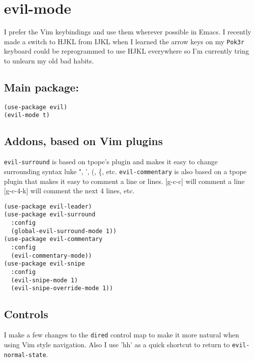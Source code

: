 \documentclass{article}
\begin{document}
\section{evil-mode}
\label{sec-7}

I prefer the Vim keybindings and use them wherever possible in Emacs. I recently made a switch to HJKL from IJKL when I learned the arrow keys on my \texttt{Pok3r} keyboard could be reprogrammed to use HJKL everywhere so I'm currently tring to unlearn my old bad habits.

\subsection{Main package:}
\label{sec-7-1}

\begin{verbatim}
(use-package evil)
(evil-mode t)
\end{verbatim}

\subsection{Addons, based on Vim plugins}
\label{sec-7-2}

\texttt{evil-surround} is based on tpope's plugin and makes it easy to change surrounding syntax luke ", ', (, \{, etc. \texttt{evil-commentary} is also based on a tpope plugin that makes it easy to comment a line or lines. [g-c-c] will comment a line [g-c-4-k] will comment the next 4 lines, etc. 

\begin{verbatim}
(use-package evil-leader)
(use-package evil-surround
  :config
  (global-evil-surround-mode 1))
(use-package evil-commentary
  :config
  (evil-commentary-mode))
(use-package evil-snipe
  :config
  (evil-snipe-mode 1)
  (evil-snipe-override-mode 1))
\end{verbatim}

\subsection{Controls}
\label{sec-7-3}

I make a few changes to the \texttt{dired} control map to make it more natural when using Vim style navigation. Also I use 'hh' as a quick shortcut to return to \texttt{evil-normal-state}.
\end{document}
